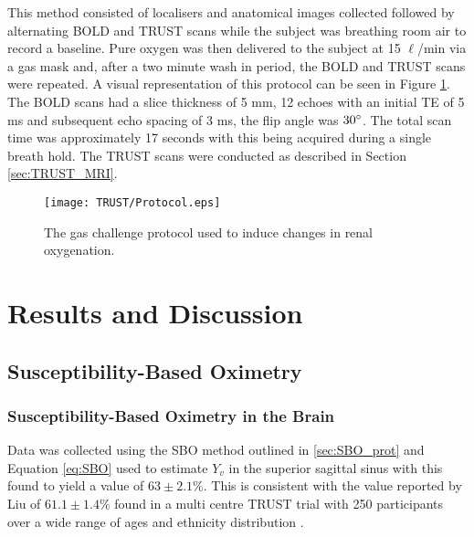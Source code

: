 This method consisted of localisers and anatomical images collected followed by alternating \ac{BOLD} \ttwostar and \ac{TRUST} scans while the subject was breathing room air to record a baseline. Pure oxygen was then delivered to the subject at 15 $\ell$/min via a gas mask and, after a two minute wash in period, the \ac{BOLD} \ttwostar and \ac{TRUST} scans were repeated. A visual representation of this protocol can be seen in Figure \ref{fig:oxygen_challenge_protocol}. The \ac{BOLD} \ttwostar scans had a slice thickness of 5 mm, 12 echoes with an initial \ac{TE} of 5 ms and subsequent echo spacing of 3 ms, the flip angle was $30\degree$. The total scan time was approximately 17 seconds with this being acquired during a single breath hold. The \ac{TRUST} scans were conducted as described in Section \ref{sec:TRUST_MRI}.

\begin{figure}[H]
	\centering
	\texttt{[image: TRUST/Protocol.eps]}
	\caption{The gas challenge protocol used to induce changes in renal oxygenation.}
	\label{fig:oxygen_challenge_protocol}	
\end{figure}

\newpage
\section{Results and Discussion}
\subsection{Susceptibility-Based Oximetry}
\subsubsection{Susceptibility-Based Oximetry in the Brain}

Data was collected using the \ac{SBO} method outlined in \ref{sec:SBO_prot} and Equation \eqref{eq:SBO} used to estimate $Y_v$ in the superior sagittal sinus with this found to yield a value of $63\pm2.1\%$. This is consistent with the value reported by Liu of $61.1\pm1.4\%$ found in a multi centre \ac{TRUST} trial with 250 participants over a wide range of ages and ethnicity distribution \cite{liu_multi-site_2016}.


